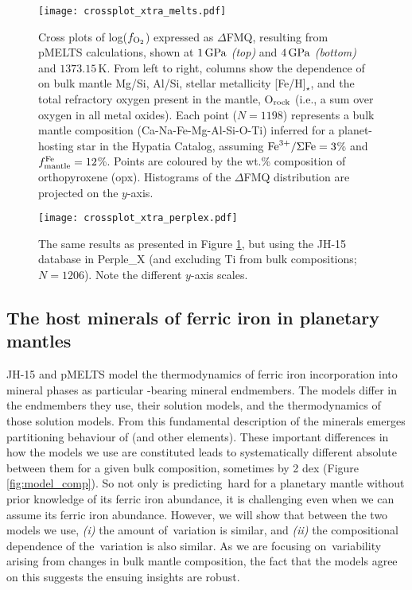 \begin{figure*}
\centering
\texttt{[image: crossplot\_xtra\_melts.pdf]}
\caption[Cross plots of log($f_{\ce{O2}}$) with various compositional parameters from pMELTS.]{\label{fig:xplots_mlts}Cross plots of log($f_{\ce{O2}}$) expressed as $\Delta$FMQ, resulting from pMELTS calculations, shown at $1\,{\rm GPa}$ \textit{(top)} and $4\,{\rm GPa}$ \textit{(bottom)} and $1373.15\,\text{K}$. From left to right, columns show the dependence of \fo\,on bulk mantle Mg/Si, Al/Si, stellar metallicity [Fe/H]$_\star$, and the total refractory oxygen present in the mantle, O$_{\rm rock}$ (i.e., a sum over oxygen in all metal oxides). Each point ($N = 1198$) represents a bulk mantle composition (Ca-Na-Fe-Mg-Al-Si-O-Ti) inferred for a planet-hosting star in the Hypatia Catalog, assuming ${\rm Fe}^{3+}/\Sigma{\rm Fe} = 3$\% and $f^{\rm Fe}_{\rm mantle} = 12$\%. Points are coloured by the  wt.\% composition of orthopyroxene (opx). Histograms of the $\Delta$FMQ distribution are projected on the $y$-axis.}
\end{figure*}

\begin{figure*}
\centering
\texttt{[image: crossplot\_xtra\_perplex.pdf]}
\caption[Cross plots of log($f_{\ce{O2}}$) with various compositional parameters from Perple\_X.]{\label{fig:xplots_px}The same results as presented in Figure \ref{fig:xplots_mlts}, but using the JH-15 database in Perple\_X (and excluding Ti from bulk compositions; $N = 1206$). Note the different $y$-axis scales.}
\end{figure*}



\subsection{The host minerals of ferric iron in planetary mantles}\label{sec:results-ferric-hosts}

JH-15 and pMELTS model the thermodynamics of ferric iron incorporation into mineral phases as particular \ferric-bearing mineral endmembers. The models differ in the endmembers they use, their solution models, and the thermodynamics of those solution models. From this fundamental description of the minerals emerges partitioning behaviour of \ferric\;(and other elements). These important differences in how the models we use are constituted leads to systematically different absolute \fo\,between them for a given bulk composition, sometimes by 2 dex (Figure \ref{fig:model_comp}). So not only is predicting \fo\,hard for a planetary mantle without prior knowledge of its ferric iron abundance, it is challenging even when we can assume its ferric iron abundance. However, we will show that between the two models we use, \textit{(i)} the amount of \fo\,variation is similar, and \textit{(ii)} the compositional dependence of the \fo\,variation is also similar. As we are focusing on \fo\,variability arising from changes in bulk mantle composition, the fact that the models agree on this suggests the ensuing insights are robust.

